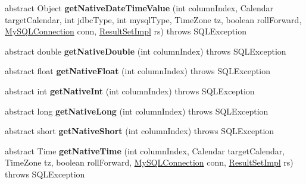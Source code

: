 \begin{DoxyCompactItemize}
abstract Object {\bfseries get\+Native\+Date\+Time\+Value} (int column\+Index, Calendar target\+Calendar, int jdbc\+Type, int mysql\+Type, Time\+Zone tz, boolean roll\+Forward, \mbox{\hyperlink{interfacecom_1_1mysql_1_1jdbc_1_1_my_s_q_l_connection}{My\+S\+Q\+L\+Connection}} conn, \mbox{\hyperlink{classcom_1_1mysql_1_1jdbc_1_1_result_set_impl}{Result\+Set\+Impl}} rs)  throws S\+Q\+L\+Exception
\item 
\mbox{\label{classcom_1_1mysql_1_1jdbc_1_1_result_set_row_afabffd30877904cad9d0f7e537175138}} 
abstract double {\bfseries get\+Native\+Double} (int column\+Index)  throws S\+Q\+L\+Exception
\item 
\mbox{\label{classcom_1_1mysql_1_1jdbc_1_1_result_set_row_a7a40f94d3b3b887285ee842752327cf1}} 
abstract float {\bfseries get\+Native\+Float} (int column\+Index)  throws S\+Q\+L\+Exception
\item 
\mbox{\label{classcom_1_1mysql_1_1jdbc_1_1_result_set_row_ad2ff0b7b1a0775a1038857b7c366b92f}} 
abstract int {\bfseries get\+Native\+Int} (int column\+Index)  throws S\+Q\+L\+Exception
\item 
\mbox{\label{classcom_1_1mysql_1_1jdbc_1_1_result_set_row_a06abf687d49995500266c3b4cc8662fa}} 
abstract long {\bfseries get\+Native\+Long} (int column\+Index)  throws S\+Q\+L\+Exception
\item 
\mbox{\label{classcom_1_1mysql_1_1jdbc_1_1_result_set_row_abc64d4718c8286b32de2201f10d2ee72}} 
abstract short {\bfseries get\+Native\+Short} (int column\+Index)  throws S\+Q\+L\+Exception
\item 
\mbox{\label{classcom_1_1mysql_1_1jdbc_1_1_result_set_row_a1202bd097aecfda59831e5c9eacc47ee}} 
abstract Time {\bfseries get\+Native\+Time} (int column\+Index, Calendar target\+Calendar, Time\+Zone tz, boolean roll\+Forward, \mbox{\hyperlink{interfacecom_1_1mysql_1_1jdbc_1_1_my_s_q_l_connection}{My\+S\+Q\+L\+Connection}} conn, \mbox{\hyperlink{classcom_1_1mysql_1_1jdbc_1_1_result_set_impl}{Result\+Set\+Impl}} rs)  throws S\+Q\+L\+Exception

\end{DoxyCompactItemize}
